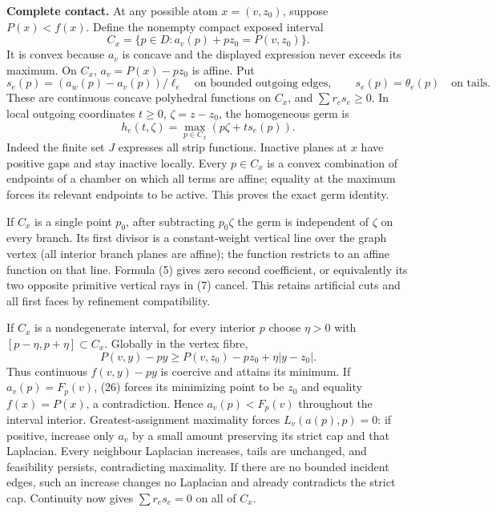 \documentclass[
  11pt,
]{article}
\begin{document}
\textbf{Complete contact.} At any possible atom \(x=(v,z_0)\), suppose
\(P(x)<f(x)\). Define the nonempty compact exposed interval \[
 C_x=\{p\in D:a_v(p)+pz_0=P(v,z_0)\}.                      \tag{23}
\] It is convex because \(a_v\) is concave and the displayed expression
never exceeds its maximum. On \(C_x\), \(a_v=P(x)-pz_0\) is affine. Put
\[
 s_e(p)=(a_w(p)-a_v(p))/\ell_e\quad\text{on bounded outgoing edges},
 \qquad s_e(p)=\theta_e(p)\quad\text{on tails}.              \tag{24}
\] These are continuous concave polyhedral functions on \(C_x\), and
\(\sum r_es_e\geq0\). In local outgoing coordinates \(t\geq0\),
\(\zeta=z-z_0\), the homogeneous germ is \[
                            h_e(t,\zeta)=\max_{p\in C_x}(p\zeta+ts_e(p)).\tag{25}
\] Indeed the finite set \(J\) expresses all strip functions. Inactive
planes at \(x\) have positive gaps and stay inactive locally. Every
\(p\in C_x\) is a convex combination of endpoints of a chamber on which
all terms are affine; equality at the maximum forces its relevant
endpoints to be active. This proves the exact germ identity.

If \(C_x\) is a single point \(p_0\), after subtracting \(p_0\zeta\) the
germ is independent of \(\zeta\) on every branch. Its first divisor is a
constant-weight vertical line over the graph vertex (all interior branch
planes are affine); the function restricts to an affine function on that
line. Formula (5) gives zero second coefficient, or equivalently its two
opposite primitive vertical rays in (7) cancel. This retains artificial
cuts and all first faces by refinement compatibility.

If \(C_x\) is a nondegenerate interval, for every interior \(p\) choose
\(\eta>0\) with \([p-\eta,p+\eta]\subset C_x\). Globally in the vertex
fibre, \[
 P(v,y)-py\geq P(v,z_0)-pz_0+\eta|y-z_0|.                 \tag{26}
\] Thus continuous \(f(v,y)-py\) is coercive and attains its minimum. If
\(a_v(p)=F_p(v)\), (26) forces its minimizing point to be \(z_0\) and
equality \(f(x)=P(x)\), a contradiction. Hence \(a_v(p)<F_p(v)\)
throughout the interval interior. Greatest-assignment maximality forces
\(L_v(a(p),p)=0\): if positive, increase only \(a_v\) by a small amount
preserving its strict cap and that Laplacian. Every neighbour Laplacian
increases, tails are unchanged, and feasibility persists, contradicting
maximality. If there are no bounded incident edges, such an increase
changes no Laplacian and already contradicts the strict cap. Continuity
now gives \(\sum r_es_e=0\) on all of \(C_x\).
\end{document}
